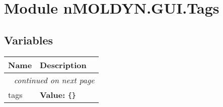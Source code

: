%
%
%


\section{Module nMOLDYN.GUI.Tags}

    \label{nMOLDYN:GUI:Tags}


  \subsection{Variables}

    \vspace{-1cm}
\hspace{\varindent}\begin{longtable}{|p{\varnamewidth}|p{\vardescrwidth}|l}
\cline{1-2}
\cline{1-2} \centering \textbf{Name} & \centering \textbf{Description}& \\
\cline{1-2}
\endhead\cline{1-2}\multicolumn{3}{r}{\small\textit{continued on next page}}\\\endfoot\cline{1-2}
\endlastfoot\raggedright t\-a\-g\-s\- & \raggedright \textbf{Value:} 
{\tt \{\}}&\\
\cline{1-2}
\end{longtable}

